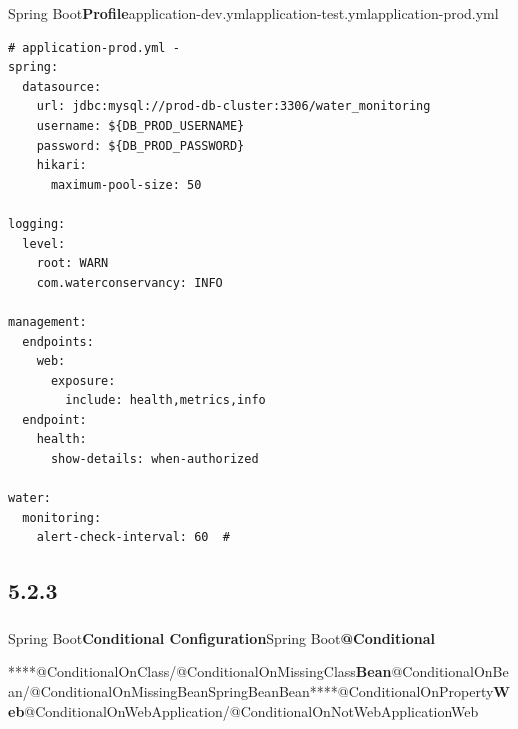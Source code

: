 Spring
Boot\textbf{Profile}application-dev.ymlapplication-test.ymlapplication-prod.yml

\begin{verbatim}
# application-prod.yml - 
spring:
  datasource:
    url: jdbc:mysql://prod-db-cluster:3306/water_monitoring
    username: ${DB_PROD_USERNAME}
    password: ${DB_PROD_PASSWORD}
    hikari:
      maximum-pool-size: 50
      
logging:
  level:
    root: WARN
    com.waterconservancy: INFO
    
management:
  endpoints:
    web:
      exposure:
        include: health,metrics,info
  endpoint:
    health:
      show-details: when-authorized

water:
  monitoring:
    alert-check-interval: 60  # 
\end{verbatim}

\subsection{5.2.3}\label{section-20}

\subsubsection{}\label{section-21}

Spring Boot\textbf{Conditional Configuration}Spring
Boot\textbf{@Conditional}

****@ConditionalOnClass/@ConditionalOnMissingClass\textbf{Bean}@ConditionalOnBean/@ConditionalOnMissingBeanSpringBeanBean****@ConditionalOnProperty\textbf{Web}@ConditionalOnWebApplication/@ConditionalOnNotWebApplicationWeb

